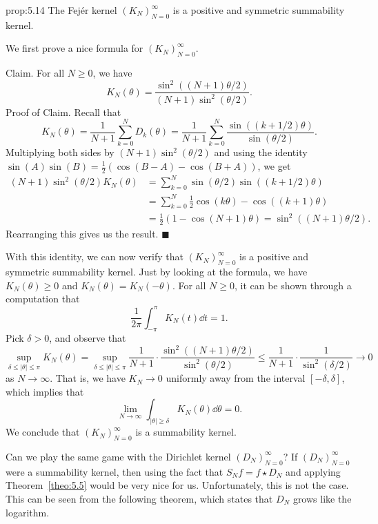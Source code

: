 \begin{prop}{prop:5.14} 
    The Fej\'er kernel $(K_N)_{N=0}^\infty$ is a positive and symmetric summability kernel. 
\end{prop}
\begin{pf}
    We first prove a nice formula for $(K_N)_{N=0}^\infty$. 

    {\sc Claim.} For all $N \geq 0$, we have 
    \[ K_N(\theta) = \frac{\sin^2((N+1)\theta/2)}{(N+1)\sin^2(\theta/2)}. \] 
    {\sc Proof of Claim.} Recall that 
    \[ K_N(\theta) = \frac{1}{N+1} \sum_{k=0}^N D_k(\theta) 
    = \frac{1}{N+1} \sum_{k=0}^N \frac{\sin((k+1/2)\theta)}{\sin(\theta/2)}. \] 
    Multiplying both sides by $(N+1) \sin^2(\theta/2)$ and using the  
    identity $\sin(A) \sin(B) = \frac12(\cos(B-A) - \cos(B+A))$, we get 
    \begin{align*}
        (N+1) \sin^2(\theta/2) K_N(\theta) 
        &= \sum_{k=0}^N \sin(\theta/2) \sin((k+1/2)\theta) \\ 
        &= \sum_{k=0}^N \frac12 \cos(k\theta) - \cos((k+1)\theta) \\ 
        &= \frac12(1 - \cos(N+1)\theta) = \sin^2((N+1)\theta/2). 
    \end{align*}
    Rearranging this gives us the result. \hfill $\blacksquare$
    
    With this identity, we can now verify that $(K_N)_{N=0}^\infty$ is a 
    positive and symmetric summability kernel. Just by looking at the 
    formula, we have $K_N(\theta) \geq 0$ and $K_N(\theta) = K_N(-\theta)$. 
    For all $N \geq 0$, it can be shown through a computation that 
    \[ \frac{1}{2\pi} \int_{-\pi}^\pi K_N(t)\dd t = 1. \] 
    Pick $\delta > 0$, and observe that 
    \[ \sup_{\delta \leq |\theta| \leq \pi} K_N(\theta) 
    = \sup_{\delta \leq |\theta| \leq \pi} \frac{1}{N+1} \cdot 
    \frac{\sin^2((N+1)\theta/2)}{\sin^2(\theta/2)} \leq 
    \frac{1}{N+1} \cdot \frac{1}{\sin^2(\delta/2)} \to 0 \] 
    as $N \to \infty$. That is, we have $K_N \to 0$ uniformly away from 
    the interval $[-\delta, \delta]$, which implies that 
    \[ \lim_{N\to\infty} \int_{|\theta|\geq\delta} K_N(\theta)\dd\theta = 0. \] 
    We conclude that $(K_N)_{N=0}^\infty$ is a summability kernel. 
\end{pf}

Can we play the same game with the Dirichlet kernel $(D_N)_{N=0}^\infty$? 
If $(D_N)_{N=0}^\infty$ were a summability kernel, then using the fact that 
$S_N f = f \star D_N$ and applying Theorem~\ref{theo:5.5} would 
be very nice for us. Unfortunately, this is not the case. This can be seen 
from the following theorem, which states that $D_N$ grows like the logarithm. 

